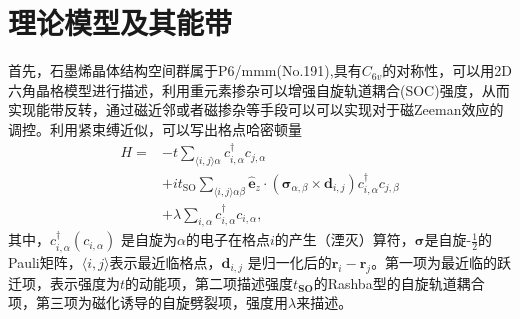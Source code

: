 	\section{理论模型及其能带}\label{sec:model}
	首先，石墨烯晶体结构空间群属于P6/mmm(No.191),具有$C_{6v}$的对称性，可以用2D六角晶格模型进行描述，利用重元素掺杂可以增强自旋轨道耦合(SOC)强度\cite{rortais2018}，从而实现能带反转，通过磁近邻\cite{Mingda2017}或者磁掺杂\cite{chang2013}等手段可以可以实现对于磁Zeeman效应的调控。利用紧束缚近似，可以写出格点哈密顿量
	\begin{equation}
	\begin{aligned}
		H=&-t\sum_{\langle i,j\rangle\alpha}c_{i,\alpha}^\dagger c_{j,\alpha}\\
            &+i t_{\text{SO}} \sum_{\langle i,j\rangle\alpha\beta}\hat{\mathbf{e}}_z\cdot(\mathbf{\sigma}_{\alpha,\beta}\times\mathbf{d}_{i,j})c_{i,\alpha}^\dagger c_{j,\beta}	\\
		&+\lambda\sum_{i,\alpha} c_{i,\alpha}^\dagger c_{i,\alpha},
		\end{aligned}
	\end{equation}
	其中，$c^\dagger_{i,\alpha}(c_{i,\alpha})$ 是自旋为$ \alpha $的电子在格点$ i $的产生（湮灭）算符，$\mathbf{\sigma}$是自旋-$\frac{1}{2}$的Pauli矩阵，$\langle i,j\rangle$表示最近临格点，$\mathbf{d}_{i,j} $ 是归一化后的$\mathbf{r}_i-\mathbf{r}_j$。第一项为最近临的跃迁项，表示强度为$t$的动能项，第二项描述强度$t_{\textbf{SO}}$的Rashba型的自旋轨道耦合项，第三项为磁化诱导的自旋劈裂项，强度用$\lambda$来描述。
	
